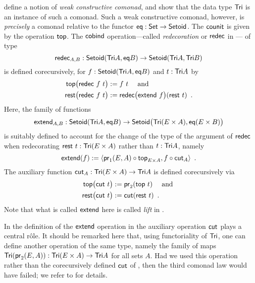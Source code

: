 \documentclass[conference,10pt]{IEEEtran}
\begin{document}
\begin{example}
\noindent
\textcite{DBLP:conf/types/MatthesP11} define a notion of \emph{weak constructive comonad}, and show that the data type $\Tri$
  is an instance of such a comonad. 
  Such a weak constructive comonad, however, is \emph{precisely}
  a comonad relative to the functor $\eq : \Set\to\Setoid$.
  The $\counit$ is given by the operation $\head$.
  The $\cobind$ operation---called \emph{redecoration} or $\redec$ in \parencite{DBLP:conf/types/MatthesP11}--- of type
   \[ \redec_{A,B} : \Setoid(\Tri A,\eq B) \to \Setoid(\Tri A,\Tri B )\] is defined 
  corecursively, for $f:\Setoid(\Tri A,\eq B)$  and $t : \Tri A$ by
      \begin{align}\head\bigl(\redec~f~t\bigr) &:= f~t \quad\text{ and } \notag\\
                     \tail\bigl(\redec~f~t\bigr) &:= \redec\bigl(\extend~f\bigr)(\tail~t) \enspace . \label{eq:rest_redec}
      \end{align}
Here, the family of functions 
     \[\extend_{A,B} : \Setoid(\Tri A,\eq B) \to \Setoid\bigr(\Tri (E \times A),\eq(E\times B)\bigr)\]
  is suitably defined to account for the change of the type of the argument of $\redec$ when redecorating $\tail~t : \Tri(E\times A)$
  rather than $t : \Tri A$, namely
  \[ \extend(f) := \langle \comp{\head_{E\times A}}{\pr_1(E,A)} , \comp{\cut_A}{f} \rangle \enspace . \]
  The auxiliary function $\cut_A : \Tri(E\times A) \to \Tri A$ is defined corecursively via
   \begin{align*}\head\bigl(\cut~t\bigr) &:= \pr_2(\head~t) \quad\text{ and } \\
                     \tail\bigl(\cut~t\bigr) &:= \cut(\tail~t) \enspace . 
      \end{align*}
 Note that what is called $\extend$ here is called \textit{lift} in \parencite{DBLP:conf/types/MatthesP11}.
\end{example}

\begin{remark}\label{rem:wrong_cut}
In the definition of the $\extend$ operation in  the auxiliary operation $\cut$ plays a central r\^ole.
It should be remarked here that, using functoriality of $\Tri$, one can define another operation of the same type, namely the family of 
maps $\Tri(\pr_2(E,A)) : \Tri(E\times A) \to \Tri A$ for
all sets $A$. Had we used this operation rather than the corecursively defined $\cut$ of , 
then the third comonad law would have failed; we refer to \parencite{DBLP:conf/types/MatthesS07} for details.
\end{remark}
\end{document}
